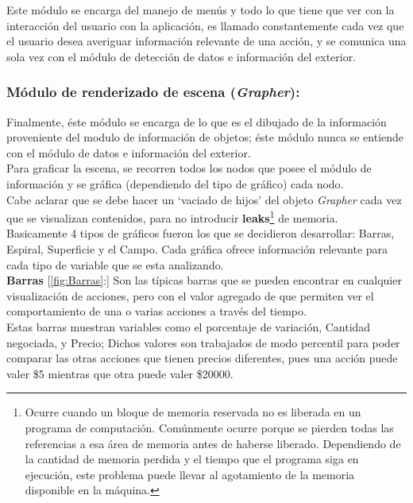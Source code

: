 \documentclass[twocolumn]{article}
\begin{document}
Este módulo se encarga del manejo de menús y todo lo que tiene que ver con la interacción del usuario con la aplicación, es llamado constantemente cada vez que el usuario desea averiguar información relevante de una acción, y  se comunica una sola vez con el módulo de detección de datos e información del exterior.\\

\subsubsection{Módulo de renderizado de escena (\emph{Grapher}):}

Finalmente, éste módulo se encarga de lo que es el dibujado de la información proveniente del modulo de información de objetos; éste módulo nunca se entiende con el módulo de datos e información del exterior.\\
 
Para graficar la escena, se recorren todos los nodos que posee el módulo de información y se gráfica (dependiendo del tipo de gráfico) cada nodo\cite{vis:InteractiveVisSmalWorldGraphs}.\\


Cabe aclarar que se debe hacer un `vaciado de hijos' del objeto \emph{Grapher} cada vez que se visualizan contenidos, para no introducir \textbf{leaks}\footnote{Ocurre cuando un bloque de memoria reservada no es liberada en un programa de computación. Comúnmente ocurre porque se pierden todas las referencias a esa área de memoria antes de haberse liberado. Dependiendo de la cantidad de memoria perdida y el tiempo que el programa siga en ejecución, este problema puede llevar al agotamiento de la memoria disponible en la máquina.} de memoria.\\



Basicamente 4 tipos de gráficos fueron los que se decidieron desarrollar: Barras, Espiral, Superficie y el Campo. Cada gráfica ofrece información relevante para cada tipo de variable que se esta analizando. \\

\textbf{Barras} [\ref{fig:Barras}:] Son las típicas barras que se pueden encontrar en cualquier visualización de acciones, pero con el valor agregado de que permiten ver el comportamiento de una o varias acciones a través del tiempo.\\

Estas barras muestran variables como el porcentaje de variación, Cantidad negociada, y Precio; Dichos valores son trabajados de modo percentil para poder comparar las otras acciones que tienen precios diferentes, pues una acción puede valer \$5 mientras que otra puede valer \$20000.\\
\end{document}
